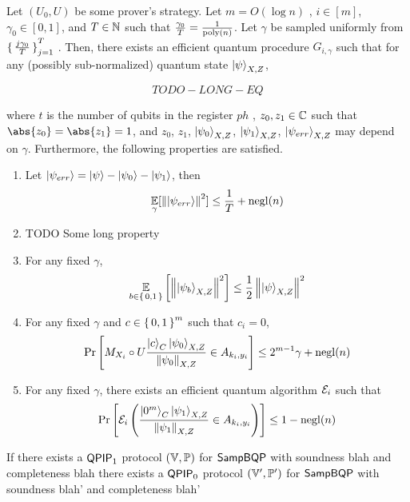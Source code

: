 \iffalse
{}
\begin{lem}
	Let $(U_0, U)$ be some prover's strategy.
	Let $m=O(\log n)$ , $i\in[m]$, $\gamma_0\in[0, 1]$, and $T\in\mathbb{N}$ such that $\frac{\gamma_0}{T}=\frac{1}{\operatorname*{\operatorname{poly}}(n)}$.
	Let $\gamma$ be sampled uniformly from $\set{\frac{j\gamma_0}{T}}^T_{j=1}$ .
	Then, there exists an efficient quantum procedure $G_{i,\gamma}$ such that for any (possibly sub-normalized) quantum state $\ket{\psi}_{X, Z}$,

	$$TODO-LONG-EQ$$

	where $t$ is the number of qubits in the register $ph$ ,
	$z_0, z_1\in\mathbb{C}$ such that $\abs{z_0}=\abs{z_1}=1$, and $z_0$, $z_1$, $\ket{\psi_0}_{X, Z}$, $\ket{\psi_1}_{X, Z}$, $\ket{\psi_{err}}_{X, Z}$ may depend on $\gamma$.
	Furthermore, the following properties are satisfied.
	\begin{enumerate}
		\item Let $\ket{\psi_{err}}=\ket{\psi}-\ket{\psi_0}-\ket{\psi_1}$, then
			$$\operatorname*{\mathbb{E}}_\gamma[\left\lVert\ket{\psi_{err}}\right\rVert^2]\leq\frac{1}{T}+\operatorname{negl}(n)$$
		\item TODO Some long property
		\item For any fixed $\gamma$,
			$$\operatorname*{\mathbb{E}}_{b\in\set{0, 1}}\left[\left\lVert\ket{\psi_{b}}_{X, Z}\right\rVert^2\right]\leq\frac{1}{2}\left\lVert\ket{\psi}_{X, Z}\right\rVert^2$$
		\item For any fixed $\gamma$ and $c\in\set{0, 1}^m$ such that $c_i=0$, 
			$$\Pr\left[M_{X_i}\circ U\frac{\ket{c}_C\ket{\psi_0}_{X,Z}}{\left\lVert\psi_0\right\rVert_{X,Z}}\in A_{k_i, y_i}\right]\leq2^{m-1}\gamma+\operatorname{negl}(n)$$
		\item For any fixed $\gamma$, there exists an efficient quantum algorithm $\mathcal{E}_i$ such that
			$$\Pr\left[\mathcal{E}_i\left(\frac{\ket{0^m}_C\ket{\psi_1}_{X,Z}}{\left\lVert\psi_1\right\rVert_{X,Z}}\in A_{k_i, y_i}\right)\right]\leq1-\operatorname{negl}(n)$$
	\end{enumerate}
\end{lem}



\begin{theorem}
    
 If there exists a $\operatorname{\mathsf{QPIP}}_1$ protocol $(\mathbb{V}, \mathbb{P})$ for $\operatorname{\mathsf{SampBQP}}$ with soundness blah and completeness blah there exists a $\operatorname{\mathsf{QPIP}}_0$ protocol $(\mathbb{V}', \mathbb{P}')$ for $\operatorname{\mathsf{SampBQP}}$ with soundness blah' and completeness blah'
	
\end{theorem}


